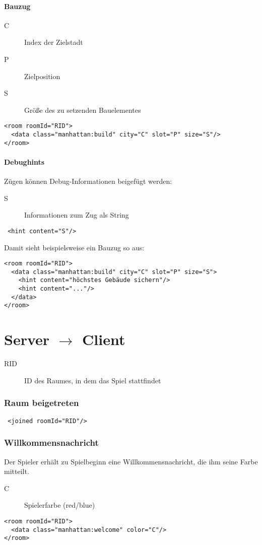 \documentclass[12pt,a4paper, german, oneside]{scrartcl}
\begin{document}
\subsection{Bauzug}
\begin{description}
\item[C] Index der Zielstadt
\item[P] Zielposition
\item[S] Größe des zu setzenden Bauelementes
\end{description}
\begin{verbatim}
<room roomId="RID">
  <data class="manhattan:build" city="C" slot="P" size="S"/>
</room>
\end{verbatim}

\subsection{Debughints}
Zügen können Debug-Informationen beigefügt werden:
\begin{description}
\item[S] Informationen zum Zug als String
\end{description}
\begin{verbatim}
 <hint content="S"/>
\end{verbatim}
Damit sieht beispielsweise ein Bauzug so aus:
\begin{verbatim}
<room roomId="RID">
  <data class="manhattan:build" city="C" slot="P" size="S">
  	<hint content="höchstes Gebäude sichern"/>
  	<hint content="..."/>
  </data>
</room>
\end{verbatim}



\newpage
\part{Server $\rightarrow$ Client}
\begin{description}
\item[RID] ID des Raumes, in dem das Spiel stattfindet
\end{description}

\section{Raum beigetreten}
 \begin{verbatim}
 <joined roomId="RID"/>
 \end{verbatim}

\section{Willkommensnachricht}
Der Spieler erhält zu Spielbeginn eine Willkommensnachricht, die ihm seine Farbe mitteilt.
\begin{description}
\item[C] Spielerfarbe (red/blue)
\end{description}
\begin{verbatim}
<room roomId="RID">
  <data class="manhattan:welcome" color="C"/>
</room>
\end{verbatim}
\end{document}
